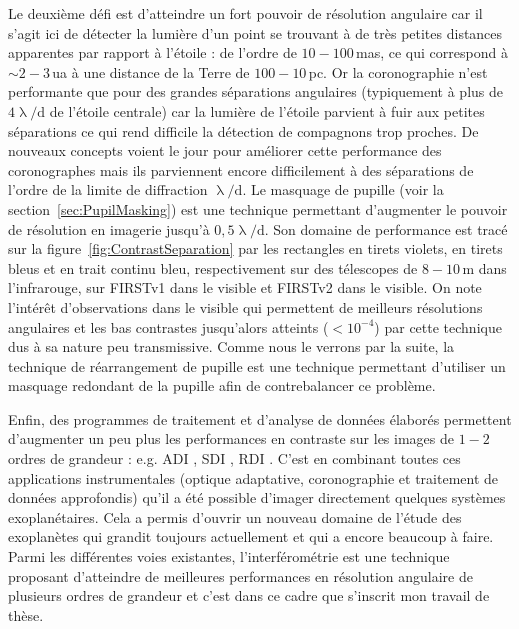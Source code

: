 Le deuxième défi est d'atteindre un fort pouvoir de résolution angulaire car il s'agit ici de détecter la lumière d'un point se trouvant à de très petites distances apparentes par rapport à l'étoile : de l'ordre de $10 - 100 \,$mas, ce qui correspond à $\sim 2-3 \,$ua à une distance de la Terre de $100 - 10 \,$pc. Or la coronographie n'est performante que pour des grandes séparations angulaires (typiquement à plus de $4 \uplambda / \text{d}$ de l'étoile centrale) car la lumière de l'étoile parvient à fuir aux petites séparations ce qui rend difficile la détection de compagnons trop proches. De nouveaux concepts voient le jour pour améliorer cette performance des coronographes \citep{mawet2012} mais ils parviennent encore difficilement à des séparations de l'ordre de la limite de diffraction $\uplambda / \text{d}$. Le masquage de pupille (voir la section~\ref{sec:PupilMasking}) est une technique permettant d'augmenter le pouvoir de résolution en imagerie jusqu'à $0,5 \uplambda / \text{d}$. Son domaine de performance est tracé sur la figure~\ref{fig:ContrastSeparation} par les rectangles en tirets violets, en tirets bleus et en trait continu bleu, respectivement sur des télescopes de $8 - 10 \,$m dans l'infrarouge, sur \acrshort{FIRSTv1} dans le visible et \ac{FIRSTv2} dans le visible. On note l'intérêt d'observations dans le visible qui permettent de meilleurs résolutions angulaires et les bas contrastes jusqu'alors atteints ($< 10^{-4}$) par cette technique dus à sa nature peu transmissive. Comme nous le verrons par la suite, la technique de réarrangement de pupille est une technique permettant d'utiliser un masquage redondant de la pupille afin de contrebalancer ce problème.

Enfin, des programmes de traitement et d'analyse de données élaborés permettent d'augmenter un peu plus les performances en contraste sur les images de $1-2$ ordres de grandeur : e.g. \ac{ADI} \citep{marois2006}, \ac{SDI} \citep{marois2000}, \ac{RDI} \citep{lafreniere2009}. C'est en combinant toutes ces applications instrumentales (optique adaptative, coronographie et traitement de données approfondis) qu'il a été possible d'imager directement quelques systèmes exoplanétaires. Cela a permis d'ouvrir un nouveau domaine de l'étude des exoplanètes qui grandit toujours actuellement et qui a encore beaucoup à faire. Parmi les différentes voies existantes, l'interférométrie est une technique proposant d'atteindre de meilleures performances en résolution angulaire de plusieurs ordres de grandeur et c'est dans ce cadre que s'inscrit mon travail de thèse.


